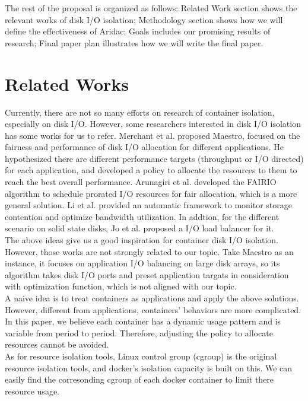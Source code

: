 \documentclass[10pt, conference,compsoc]{IEEEtran}
\begin{document}
The rest of the proposal is organized as follows: Related Work section shows the relevant works of disk I/O isolation; Methodology section shows how we will define the effectiveness of Aridac; Goals includes our promising results of research; Final paper plan illustrates how we will write the final paper. 

\section{Related Works}
Currently, there are not so many efforts on research of container isolation, especially on disk I/O. However, some researchers interested in disk I/O isolation has some works for us to refer. Merchant et al. \cite{Merchant2011MaestroQI} proposed Maestro, focused on the fairness and performance of disk I/O allocation for different applications. He hypothesized there are different performance targets (throughput or I/O directed) for each application, and developed a policy to allocate the resources to them to reach the best overall performance. Arunagiri et al.\cite{Arunagiri2011FAIRIOAA} developed the FAIRIO algorithm to schedule prorated I/O resources for fair allocation, which is a more general solution. Li et al.\cite{Li2015ASCARAC} provided an automatic framework to monitor storage contention and optimize bandwidth utilization. In addtion, for the different scenario on solid state disks, Jo et al.\cite{Jo2017DynamicLB} proposed a I/O load balancer for it. \\

The above ideas give us a good inspiration for container disk I/O isolation. However, those works are not strongly related to our topic. Take Maestro as an instance, it focuses on application I/O balancing on large disk arrays, so its algorithm takes disk I/O ports and preset application targats in consideration with optimization function, which is not aligned with our topic.\\

A naive idea is to treat containers as applications and apply the above solutions. However, different from applications, containers' behaviors are more complicated. In this paper, we believe each container has a dynamic usage pattern and is variable from period to period. Therefore, adjusting the policy to allocate resources cannot be avoided.\\

As for resource isolation tools, Linux control group (cgroup) is the original resource isolation tools, and docker's isolation capacity is built on this. We can easily find the corresonding cgroup of each docker container to limit there resource usage.\\
\end{document}
